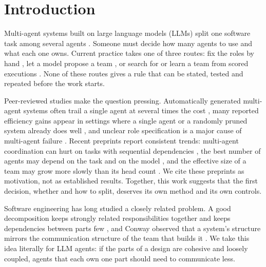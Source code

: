 \section{Introduction}
\label{sec:intro}

Multi-agent systems built on large language models (LLMs) split one software task among several agents \citep{hong2024metagpt,qian2024chatdev,wu2023autogen}. Someone must decide how many agents to use and what each one owns. Current practice takes one of three routes: fix the roles by hand \citep{hong2024metagpt,qian2024chatdev}, let a model propose a team \citep{ke2025maszero}, or search for or learn a team from scored executions \citep{hu2025adas,zhang2025aflow,zhang2025maas}. None of these routes gives a rule that can be stated, tested and repeated before the work starts.

Peer-reviewed studies make the question pressing. Automatically generated multi-agent systems often trail a single agent at several times the cost \citep{jwalapuram2026illusion}, many reported efficiency gains appear in settings where a single agent or a randomly pruned system already does well \citep{zhang2026rethinking}, and unclear role specification is a major cause of multi-agent failure \citep{cemri2025why}. Recent preprints report consistent trends: multi-agent coordination can hurt on tasks with sequential dependencies \citep{kim2025scaling}, the best number of agents may depend on the task and on the model \citep{li2026scalingbehavior}, and the effective size of a team may grow more slowly than its head count \citep{bertalanic2026ringelmann}. We cite these preprints as motivation, not as established results. Together, this work suggests that the first decision, whether and how to split, deserves its own method and its own controls.

Software engineering has long studied a closely related problem. A good decomposition keeps strongly related responsibilities together and keeps dependencies between parts few \citep{parnas1972criteria,chidamber1994metrics}, and Conway observed that a system's structure mirrors the communication structure of the team that builds it \citep{conway1968committees}. We take this idea literally for LLM agents: if the parts of a design are cohesive and loosely coupled, agents that each own one part should need to communicate less.

